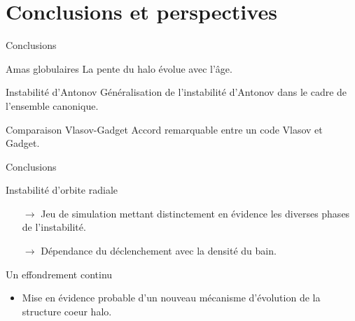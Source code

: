 \documentclass[slidetop,12pt,ucs]{beamer}
\renewcommand{\(}{\ensuremath{\left(}}
\renewcommand{\)}{\ensuremath{\right)}}
\begin{document}
	\section{Conclusions et perspectives}
		\begin{frame}[t]{Conclusions}
			\begin{block}{Amas globulaires}
				La pente du halo évolue avec l'âge.
			\end{block}
			\begin{block}{Instabilité d'Antonov}
				Généralisation de l'instabilité d'Antonov dans le cadre de l'ensemble canonique.
			\end{block}
			\begin{block}{Comparaison Vlasov-Gadget}
				Accord remarquable entre un code Vlasov et Gadget.
			\end{block}
		\end{frame}
		\begin{frame}[t]{Conclusions}
			\begin{alertblock}{Instabilité d'orbite radiale}
				\begin{itemize}
					\item[$\rightarrow$] Jeu de simulation mettant distinctement en évidence les diverses phases de l'instabilité.
					\item[$\rightarrow$] Dépendance du déclenchement avec la densité du bain.
				\end{itemize}
			\end{alertblock}
			\begin{exampleblock}{Un effondrement continu}
				\begin{itemize}
					\item Mise en évidence probable d'un nouveau mécanisme d'évolution de la structure coeur halo.
				\end{itemize}
			\end{exampleblock}

		\end{frame}
\end{document}
